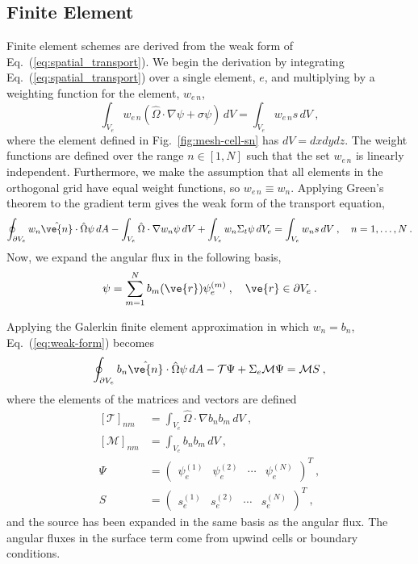 \documentclass[12pt]{article}
\newcommand{\vOmega}{\ensuremath{\hat{\Omega}}}
\begin{document}
\subsection*{Finite Element}
Finite element schemes are derived from the weak form of
Eq.~(\ref{eq:spatial_transport}). We begin the derivation by
integrating Eq.~(\ref{eq:spatial_transport}) over a single element, $e$, and
multiplying by a weighting function for the element, $w_{e\,n}$,
\begin{equation}
  \int_{V_e} w_{e\,n}(\vOmega\cdot\nabla\psi+\sigma\psi)\,dV =
  \int_{V_e} w_{e\,n}s\,dV\:,
\end{equation}
where the element defined in Fig.~\ref{fig:mesh-cell-sn} has $dV=dxdydz$.  The
weight functions are defined over the range $n\in[1,N]$ such that the set
$w_{e\,n}$ is linearly independent.  Furthermore, we make the assumption that
all elements in the orthogonal grid have equal weight functions, so
$w_{e\,n}\equiv w_n$.  Applying Green's theorem to the gradient term gives the
weak form of the transport equation,
\begin{equation}
  \oint_{\partial V_e}w_n\hat{\ve{n}}\cdot\vOmega\psi\,dA -
  \int_{V_e}\vOmega\cdot\nabla w_n\psi\,dV + \int_{V_e} w_n\Sigma_t\psi\,dV_e =
  \int_{V_e}w_ns\,dV\:, \quad n=1,\ldots,N\:.
  \label{eq:weak-form}
\end{equation}
Now, we expand the angular flux in the following basis,
\begin{equation}
  \psi = \sum_{m=1}^{N}b_m(\ve{r})\psi_e^{(m)}\:,\quad
  \ve{r}\in\partial V_e\:.
  \label{eq:psi_fe_expansion}
\end{equation}

Applying the Galerkin finite element approximation in which $w_n=b_n$,
Eq.~(\ref{eq:weak-form}) becomes
\begin{equation}
  \oint_{\partial V_e}b_n\hat{\ve{n}}\cdot\vOmega\psi\,dA -
  \mathcal{T}\Psi + \Sigma_e\mathcal{M}\Psi = \mathcal{M}S\:,
  \label{eq:matrix-weak-form}
\end{equation}
where the elements of the matrices and vectors are defined
\begin{equation}
  \begin{aligned}
    \left[\mathcal{T}\right]_{nm} &= \int_{V_e}\vOmega\cdot\nabla
    b_n b_m\,dV\:,\\
    \left[\mathcal{M}\right]_{nm} &= \int_{V_e}b_nb_m\,dV\:, \\
    \Psi &= \begin{pmatrix} \psi_e^{(1)} & \psi_e^{(2)} & \cdots &
      \psi_e^{(N)}
    \end{pmatrix}^T\:,\\
    S &= \begin{pmatrix} s_e^{(1)} & s_e^{(2)} & \cdots & s_e^{(N)}
    \end{pmatrix}^T\:,
  \end{aligned}
  \label{eq:weak_form_matrices}
\end{equation}
and the source has been expanded in the same basis as the angular flux.  The
angular fluxes in the surface term come from upwind cells or boundary
conditions.
\end{document}
